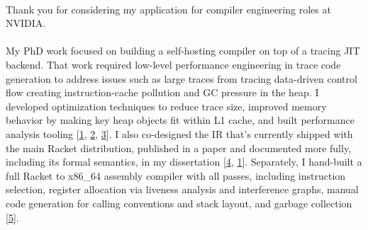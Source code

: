 

\newcommand{\dissertationurl}{https://github.com/cderici/dissertation/releases/download/latest-pdf/thesis.pdf}
\newcommand{\pycketperfurl}{https://github.com/cderici/pycket-performance}
\newcommand{\tracedrawurl}{https://github.com/cderici/trace-draw}
\newcommand{\raxurl}{https://github.com/cderici/rax}
\newcommand{\icfpreporturl}{https://dl.acm.org/doi/10.1145/3341642}
\newcommand{\atwurl}{https://github.com/cderici/around-the-world-in-26-languages}
\newcommand{\homelaburl}{https://home.dericilab.live/homelab/}



\paragraph{} %
Thank you for considering my application for compiler engineering roles at NVIDIA.

\paragraph{} %
My PhD work focused on building a self-hosting compiler on top of a tracing JIT backend. That work required low-level performance engineering in trace code generation to address issues such as large traces from tracing data-driven control flow creating instruction-cache pollution and GC pressure in the heap. I developed optimization techniques to reduce trace size, improved memory behavior by making key heap objects fit within L1 cache, and built performance analysis tooling [\href{\dissertationurl}{1}, \href{\pycketperfurl}{2}, \href{\tracedrawurl}{3}]. I also co-designed the IR that's currently shipped with the main Racket distribution, published in a paper and documented more fully, including its formal semantics, in my dissertation [\href{\icfpreporturl}{4}, \href{\dissertationurl}{1}]. Separately, I hand-built a full Racket to x86\_64 assembly compiler with all passes, including instruction selection, register allocation via liveness analysis and interference graphs, manual code generation for calling conventions and stack layout, and garbage collection [\href{\raxurl}{5}].

